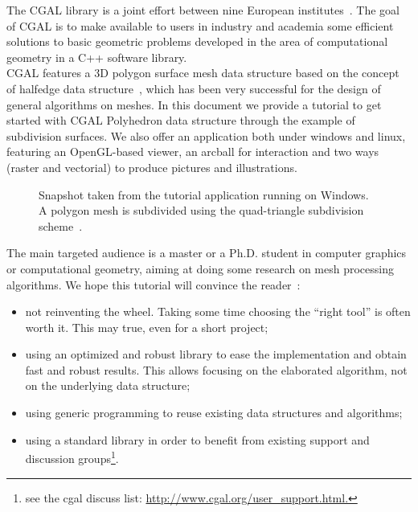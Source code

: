 \documentclass[letter,twoside,10pt]{article}
\begin{document}

The CGAL library is a joint effort between nine European
institutes~\cite{fgkss-dccga-00}. The goal of CGAL is to make
available to users in industry and academia some efficient solutions
to basic geometric problems developed in the area of computational
geometry in a C++ software library.\\


CGAL features a 3D polygon surface mesh data structure based on the
concept of halfedge data structure~\cite{k-ugpdd-99}, which has been
very successful for the design of general algorithms on meshes. In
this document we provide a tutorial to get started with CGAL
Polyhedron data structure through the example of subdivision
surfaces. We also offer an application both under windows and linux,
featuring an OpenGL-based viewer, an arcball for interaction and two
ways (raster and vectorial) to produce pictures and illustrations.\\


\begin{figure}[htb]
    \caption{Snapshot taken from the tutorial application running
             on Windows. A polygon mesh is subdivided using the
             quad-triangle subdivision scheme~\cite{sl-qts-02}.}
    \label{fig:teaser}
\end{figure}
        


The main targeted audience is a master or a Ph.D. student in computer
graphics or computational geometry, aiming at doing some research on
mesh processing algorithms. We hope this tutorial will convince the
reader~:

\begin{itemize}

\item 
not reinventing the wheel. Taking some time choosing the ``right
tool'' is often worth it. This may true, even for a short project;

\item 
using an optimized and robust library to ease the implementation and
obtain fast and robust results. This allows focusing on the elaborated
algorithm, not on the underlying data structure;

\item 
using generic programming to reuse existing data structures
and algorithms;

\item 
using a standard library in order to benefit from existing support and
discussion groups\footnote{see the cgal discuss list:
\href{http://www.cgal.org/user_support.html}
{http://www.cgal.org/user\_support.html.}}.

\end{itemize}               
\end{document}
